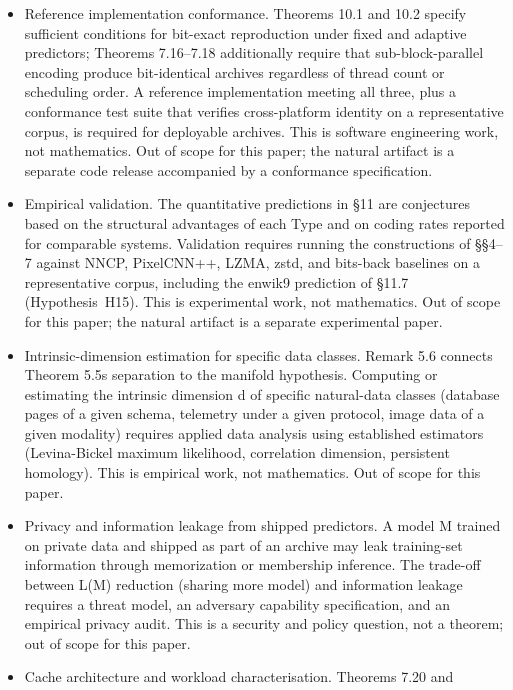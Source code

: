 \documentclass[
]{article}
\begin{document}
\begin{itemize}
\item
  Reference implementation conformance. Theorems 10.1 and 10.2 specify
  sufficient conditions for bit-exact reproduction under fixed and
  adaptive predictors; Theorems 7.16--7.18 additionally require that
  sub-block-parallel encoding produce bit-identical archives regardless
  of thread count or scheduling order. A reference implementation
  meeting all three, plus a conformance test suite that verifies
  cross-platform identity on a representative corpus, is required for
  deployable archives. This is software engineering work, not
  mathematics. Out of scope for this paper; the natural artifact is a
  separate code release accompanied by a conformance specification.
\item
  Empirical validation. The quantitative predictions in §11 are
  conjectures based on the structural advantages of each Type and on
  coding rates reported for comparable systems. Validation requires
  running the constructions of §§4--7 against NNCP, PixelCNN++, LZMA,
  zstd, and bits-back baselines on a representative corpus, including
  the enwik9 prediction of §11.7 (Hypothesis~H15). This is
  experimental work, not mathematics. Out of scope for this paper; the
  natural artifact is a separate experimental paper.
\item
  Intrinsic-dimension estimation for specific data classes. Remark 5.6
  connects Theorem 5.5\textquotesingle s separation to the manifold
  hypothesis. Computing or estimating the intrinsic dimension d of
  specific natural-data classes (database pages of a given schema,
  telemetry under a given protocol, image data of a given modality)
  requires applied data analysis using established estimators
  (Levina-Bickel maximum likelihood, correlation dimension, persistent
  homology). This is empirical work, not mathematics. Out of scope for
  this paper.
\item
  Privacy and information leakage from shipped predictors. A model M
  trained on private data and shipped as part of an archive may leak
  training-set information through memorization or membership inference.
  The trade-off between L(M) reduction (sharing more model) and
  information leakage requires a threat model, an adversary capability
  specification, and an empirical privacy audit. This is a security and
  policy question, not a theorem; out of scope for this paper.
\item
  Cache architecture and workload characterisation. Theorems 7.20 and

\end{itemize}
\end{document}
